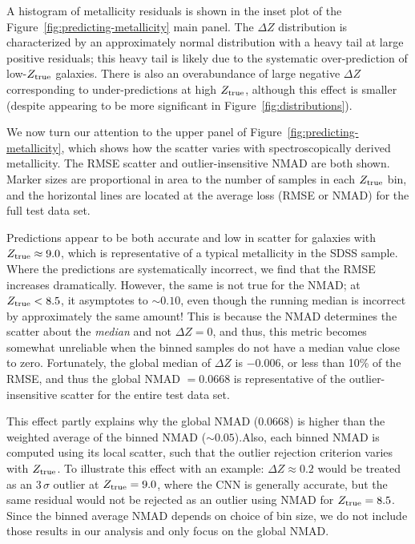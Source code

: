 \documentclass[fleqn,usenatbib]{mnras}
\begin{document}
A histogram of metallicity residuals is shown in the inset plot of the Figure~\ref{fig:predicting-metallicity} main panel. The $\Delta Z$ distribution is characterized by an approximately normal distribution with a heavy tail at large positive residuals; this heavy tail is likely due to the systematic over-prediction of low-$Z_{\rm true}$ galaxies.
There is also an overabundance of large negative $\Delta Z$ corresponding to under-predictions at high $Z_{\rm true}$, although this effect is smaller (despite appearing to be more significant in Figure~\ref{fig:distributions}).

We now turn our attention to the upper panel of Figure~\ref{fig:predicting-metallicity}, which shows how the scatter varies with spectroscopically derived metallicity. The RMSE scatter and outlier-insensitive NMAD are both shown. Marker sizes are proportional in area to the number of samples in each $Z_{\rm true}$ bin, and the horizontal lines are located at the average loss (RMSE or NMAD) for the full test data set.

Predictions appear to be both accurate and low in scatter for galaxies with $Z_{\rm true} \approx 9.0$, which is representative of a typical metallicity in the SDSS sample. Where the predictions are systematically incorrect, we find that the RMSE increases dramatically. However, the same is not true for the NMAD; at $Z_{\rm true} < 8.5$, it asymptotes to $\sim 0.10$, even though the running median is incorrect by approximately the same amount! This is because the NMAD determines the scatter about the \textit{median} and not $\Delta Z = 0$, and thus, this metric becomes somewhat unreliable when the binned samples do not have a median value close to zero. Fortunately, the global median of $\Delta Z$ is $-0.006$, or less than 10\% of the RMSE, and thus the global NMAD $= 0.0668$ is representative of the outlier-insensitive scatter for the entire test data set.

This effect partly explains why the global NMAD (0.0668) is higher than the weighted average of the binned NMAD ($\sim 0.05$).Also, each binned NMAD is computed using its local scatter, such that the outlier rejection criterion varies with $Z_{\rm true}$. To illustrate this effect with an example: $\Delta Z \approx 0.2$ would be treated as an $3\,\sigma$ outlier at $Z_{\rm true} = 9.0$, where the CNN is generally accurate, but the same residual would not be rejected as an outlier using NMAD for $Z_{\rm true} = 8.5$.
Since the binned average NMAD depends on choice of bin size, we do not include those results in our analysis and only focus on the global NMAD.
\end{document}
